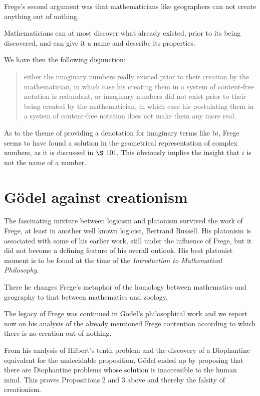 \documentclass[12pt]{article}
\begin{document}
Frege's second argument was that mathematicians like geographers can not create anything out of nothing.

Mathematicians can at most discover what already existed, prior to its being discovered, and can give it a name and describe its properties.

We have then the following disjunction:

\begin{quote}
either the imaginary numbers really existed prior to their creation by the mathematician, in which case his creating them in a system of content-free notation is redundant, or imaginary numbers did not exist prior to their being created by the mathematician, in which case his postulating them in a system of content-free notation does not make them any more real.  
\end{quote}

As to the theme of providing a denotation for imaginary terms like $\text{b}i$, Frege seems to have found a solution in the geometrical representation of complex numbers, as it is discussed in $\S$ 101. This obviously implies the insight that $i$ is not the name of a number. 

\section{G\"{o}del against creationism}\normalsize

The fascinating mixture between logicism and platonism survived the work of Frege, at least in another well known logicist, Bertrand Russell. His platonism is associated with some of his earlier work, still under the influence of Frege, but it did not become a defining feature of his overall outlook. His best platonist moment is to be found at the time of the \emph{Introduction to Mathematical Philosophy}.

There he changes Frege's metaphor of the homology between mathematics and geography to that between mathematics and zoology.

The legacy of Frege was continued in G\"{o}del's philosophical work and we report now on his analysis of the already mentioned Frege contention according to which there is no creation out of nothing.

From his analysis of Hilbert's tenth problem and the discovery of a Diophantine equivalent for the undecidable proposition, G\"{o}del ended up by proposing that there are Diophantine problems whose solution is inaccessible to the human mind. This proves Propositions 2 and 3 above and thereby the falsity of creationism.
\end{document}

